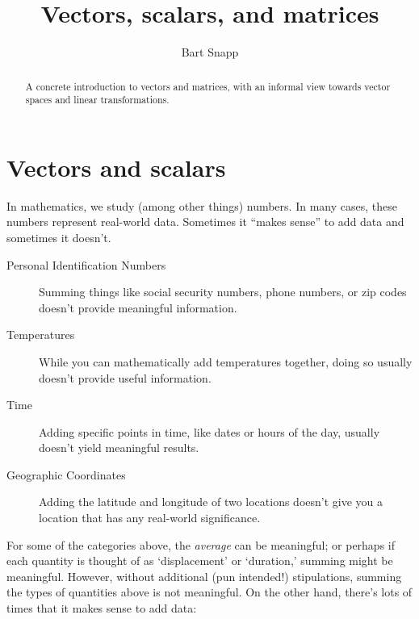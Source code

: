 \documentclass{ximera}
\author{Bart Snapp}
\title{Vectors, scalars, and matrices}
\begin{document}
\begin{abstract}
  A concrete introduction to vectors and matrices, with an informal
  view towards vector spaces and linear transformations.
\end{abstract}
\maketitle


\section{Vectors and scalars}

In mathematics, we study (among other things) numbers. In many cases,
these numbers represent real-world data. Sometimes it ``makes sense''
to add data and sometimes it doesn't.
\begin{concept}
\begin{description}
\item[Personal Identification Numbers] Summing things like social
  security numbers, phone numbers, or zip codes doesn't provide
  meaningful information.
\item[Temperatures] While you can mathematically add temperatures
  together, doing so usually doesn't provide useful information.
\item[Time] Adding specific points in time, like dates or hours of the
  day, usually doesn't yield meaningful results.
\item[Geographic Coordinates] Adding the latitude and longitude of two
  locations doesn't give you a location that has any real-world
  significance.
\end{description}
\end{concept}
For some of the categories above, the \textit{average} can be
meaningful; or perhaps if each quantity is thought of as
`displacement' or `duration,' summing might be meaningful. However,
without additional (pun intended!) stipulations, summing the types of
quantities above is not meaningful. On the other hand, there's lots of
times that it makes sense to add data:
\end{document}
